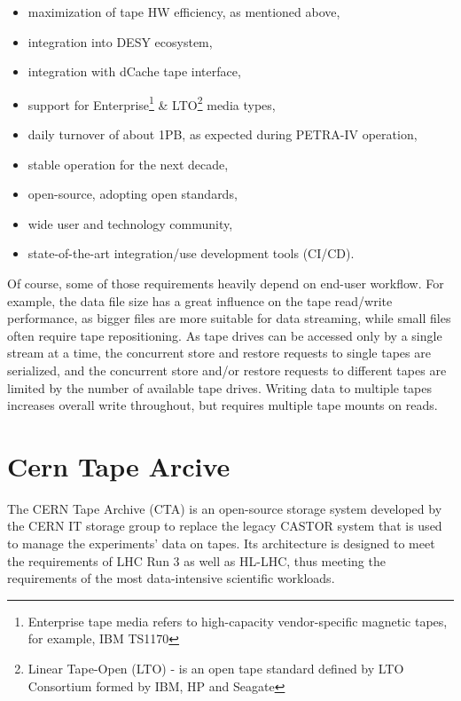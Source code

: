 \documentclass{webofc}
\begin{document}
\begin{itemize}
    \item maximization of tape HW efficiency, as mentioned above,
    \item integration into DESY ecosystem,
    \item integration with dCache tape interface,
    \item support for Enterprise\footnote{Enterprise tape media refers to high-capacity vendor-specific magnetic tapes, for example, IBM TS1170\cite{ibm_ts1170}} \& LTO\footnote{Linear Tape-Open (LTO) - is an open tape standard defined by LTO Consortium\cite{lto_consortium} formed by IBM, HP and Seagate} media types,
    \item daily turnover of about 1PB, as expected during PETRA-IV operation,
    \item stable operation for the next decade,
    \item open-source, adopting open standards,
    \item wide user and technology community,
    \item state-of-the-art integration/use development tools (CI/CD).
\end{itemize}

Of course, some of those requirements heavily depend on end-user workflow. For example, the data file size has a great influence on the tape read/write performance, as bigger files are more suitable for data streaming, while small files often require tape repositioning. As tape drives can be accessed only by a single stream at a time, the concurrent store and restore requests to single tapes are serialized, and the concurrent store and/or restore requests to different tapes are limited by the number of available tape drives. Writing data to multiple tapes increases overall write throughout, but requires multiple tape mounts on reads.

\section{Cern Tape Arcive}
\label{sec:cta}

The CERN Tape Archive (CTA)\cite{cta} is an open-source storage system developed by the CERN IT storage group to
replace the legacy CASTOR system that is used to manage the experiments' data on tapes. Its architecture is designed
to meet the requirements of LHC Run 3 as well as HL-LHC, thus meeting the requirements of the most data-intensive scientific workloads.
\end{document}
